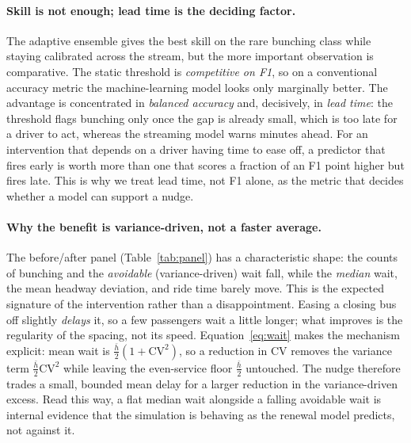 \documentclass[11pt,a4paper]{article}
\begin{document}
\paragraph{Skill is not enough; lead time is the deciding factor.}
The adaptive ensemble gives the best skill on the rare bunching class while staying calibrated
across the stream, but the more important observation is comparative. The static threshold is
\emph{competitive on F1}, so on a conventional accuracy metric the machine-learning model looks only
marginally better. The advantage is concentrated in \emph{balanced accuracy} and, decisively, in
\emph{lead time}: the threshold flags bunching only once the gap is already small, which is too late
for a driver to act, whereas the streaming model warns minutes ahead. For an intervention that
depends on a driver having time to ease off, a predictor that fires early is worth more than one
that scores a fraction of an F1 point higher but fires late. This is why we treat lead time, not F1
alone, as the metric that decides whether a model can support a nudge.

\paragraph{Why the benefit is variance-driven, not a faster average.}
The before/after panel (Table~\ref{tab:panel}) has a characteristic shape: the counts of bunching
and the \emph{avoidable} (variance-driven) wait fall, while the \emph{median} wait, the mean headway
deviation, and ride time barely move. This is the expected signature of the intervention rather than
a disappointment. Easing a closing bus off slightly \emph{delays} it, so a few passengers wait a
little longer; what improves is the regularity of the spacing, not its speed. Equation~\eqref{eq:wait}
makes the mechanism explicit: mean wait is $\tfrac{\bar h}{2}(1+\mathrm{CV}^2)$, so a reduction in
$\mathrm{CV}$ removes the variance term $\tfrac{\bar h}{2}\mathrm{CV}^2$ while leaving the
even-service floor $\tfrac{\bar h}{2}$ untouched. The nudge therefore trades a small, bounded mean
delay for a larger reduction in the variance-driven excess. Read this way, a flat median wait
alongside a falling avoidable wait is internal evidence that the simulation is behaving as the
renewal model predicts, not against it.
\end{document}
